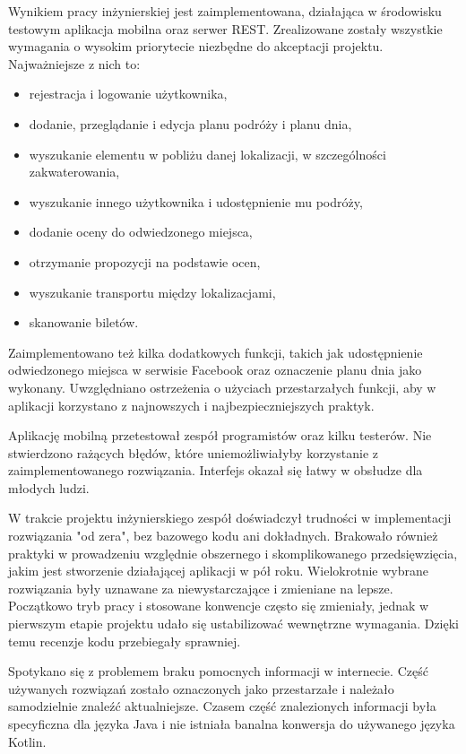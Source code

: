 \documentclass[10pt,twoside,a4paper]{report}
\begin{document}
\par Wynikiem pracy inżynierskiej jest zaimplementowana, działająca w środowisku testowym aplikacja mobilna oraz serwer REST. Zrealizowane zostały wszystkie wymagania o wysokim priorytecie niezbędne do akceptacji projektu. Najważniejsze z nich to:
\begin{itemize}
\item rejestracja i logowanie użytkownika,
\item dodanie, przeglądanie i edycja planu podróży i planu dnia,
\item wyszukanie elementu w pobliżu danej lokalizacji, w szczególności zakwaterowania,
\item wyszukanie innego użytkownika i udostępnienie mu podróży,
\item dodanie oceny do odwiedzonego miejsca,
\item otrzymanie propozycji na podstawie ocen,
\item wyszukanie transportu między lokalizacjami,
\item skanowanie biletów.
\end{itemize}

\par Zaimplementowano też kilka dodatkowych funkcji, takich jak udostępnienie odwiedzonego miejsca w serwisie Facebook oraz oznaczenie planu dnia jako wykonany. Uwzględniano ostrzeżenia o użyciach przestarzałych funkcji, aby w aplikacji korzystano z najnowszych i najbezpieczniejszych praktyk.

\par Aplikację mobilną przetestował zespół programistów oraz kilku testerów. Nie stwierdzono rażących błędów, które uniemożliwiałyby korzystanie z zaimplementowanego rozwiązania. Interfejs okazał się łatwy w obsłudze dla młodych ludzi.

\par W trakcie projektu inżynierskiego zespół doświadczył trudności w implementacji rozwiązania "od zera", bez bazowego kodu ani dokładnych. Brakowało również praktyki w prowadzeniu względnie obszernego i skomplikowanego przedsięwzięcia, jakim jest stworzenie działającej aplikacji w pół roku. Wielokrotnie wybrane rozwiązania były uznawane za niewystarczające i zmieniane na lepsze. Początkowo tryb pracy i stosowane konwencje często się zmieniały, jednak w pierwszym etapie projektu udało się ustabilizować wewnętrzne wymagania. Dzięki temu recenzje kodu przebiegały sprawniej.

\par Spotykano się z problemem braku pomocnych informacji w internecie. Część używanych rozwiązań zostało oznaczonych jako przestarzałe i należało samodzielnie znaleźć aktualniejsze. Czasem część znalezionych informacji była specyficzna dla języka Java i nie istniała banalna konwersja do używanego języka Kotlin.
\end{document}
